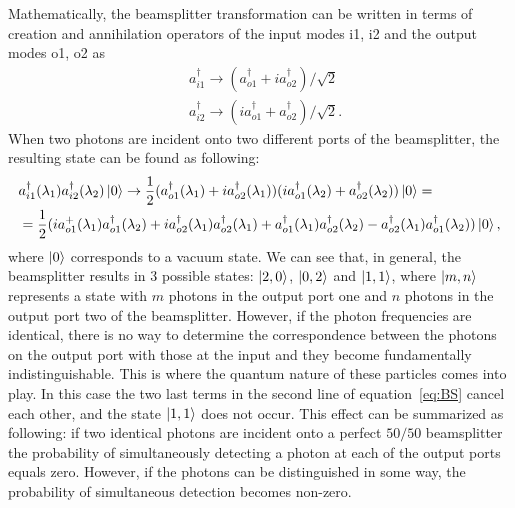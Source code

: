 Mathematically, the beamsplitter transformation can be written in terms of creation and annihilation operators of the input modes i1, i2 and the output modes o1, o2 as
\begin{equation}
\begin{aligned}
& a_{i1}^{\dagger} \rightarrow (a_{o1}^{\dagger} + ia_{o2}^{\dagger} )/\sqrt{2} \\
& a_{i2}^{\dagger} \rightarrow (ia_{o1}^{\dagger} + a_{o2}^{\dagger} )/\sqrt{2}.
\end{aligned}
\end{equation}
When two photons are incident onto two different ports of the beamsplitter, the resulting state can be found as following:
\begin{equation}
\begin{split}
& a_{i1}^{\dagger}(\lambda_1) a^{\dagger}_{i2}(\lambda_2) \left|0\right\rangle \rightarrow  \frac{1}{2} (a_{o1}^{\dagger}(\lambda_1) +ia_{o2}^{\dagger}(\lambda_1) ) (ia_{o1}^{\dagger}(\lambda_2) +a_{o2}^{\dagger}(\lambda_2) )\left|0\right\rangle = \\
&=\frac{1}{2} (i a_{o1}^+(\lambda_1) a_{o1}^{\dagger}(\lambda_2) + ia_{o2}^{\dagger}(\lambda_1)a_{o2}^{\dagger}(\lambda_1) +a_{o1}^{\dagger}(\lambda_1) a_{o2}^{\dagger}(\lambda_2) - a_{o2}^{\dagger}(\lambda_1) a_{o1}^{\dagger}(\lambda_2))\left|0\right\rangle,
\end{split}
\label{eq:BS}
\end{equation}
where $\left|0\right\rangle$ corresponds to a vacuum state. We can see that, in general, the beamsplitter results in $3$ possible states: $\left|2,0\right\rangle$, $\left|0,2\right\rangle$ and $\left|1,1\right\rangle$, where $\left|m,n\right\rangle$ represents a state with $m$ photons in the output port one and $n$ photons in the output port two of the beamsplitter. However, if the photon frequencies are identical, there is no way to determine the correspondence between the photons on the output port with those at the input and they become fundamentally indistinguishable. This is where the quantum nature of these particles comes into play. In this case the two last terms in the second line of equation~\ref{eq:BS} cancel each other, and the state $\left|1,1\right\rangle$ does not occur. This effect can be summarized as following: if two identical photons are incident onto a perfect $50/50$ beamsplitter the probability of simultaneously detecting a photon at each of the output ports equals zero. However, if the photons can be distinguished in some way, the probability of simultaneous detection becomes non-zero.

